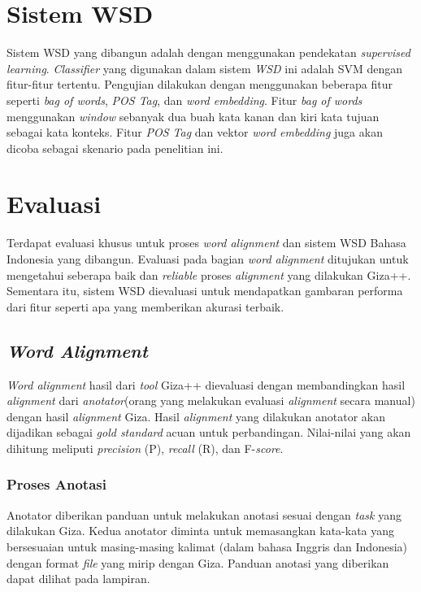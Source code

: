 \section{Sistem WSD} \label{sec:Sistem WSD}
Sistem WSD yang dibangun adalah dengan menggunakan pendekatan \textit{supervised learning}. \textit{Classifier} yang digunakan dalam sistem \textit{WSD} ini adalah SVM dengan fitur-fitur tertentu. Pengujian dilakukan dengan menggunakan beberapa fitur seperti \textit{bag of words}, \textit{POS Tag}, dan \textit{word embedding}. Fitur \textit{bag of words} menggunakan \textit{window} sebanyak dua buah kata kanan dan kiri kata tujuan sebagai kata konteks. Fitur \textit{POS Tag} dan vektor \textit{word embedding} juga akan dicoba sebagai skenario pada penelitian ini.

\section{Evaluasi}

Terdapat evaluasi khusus untuk proses \textit{word alignment} dan sistem WSD Bahasa Indonesia yang dibangun. Evaluasi pada bagian \textit{word alignment} ditujukan untuk mengetahui seberapa baik dan \textit{reliable} proses \textit{alignment} yang dilakukan Giza++. Sementara itu, sistem WSD dievaluasi untuk mendapatkan gambaran performa dari fitur seperti apa yang memberikan akurasi terbaik.

\subsection{\textit{Word Alignment}}
\textit{Word alignment} hasil dari \textit{tool} Giza++ dievaluasi dengan membandingkan hasil \textit{alignment} dari \textit{anotator}(orang yang melakukan evaluasi \textit{alignment} secara manual) dengan hasil \textit{alignment} Giza. Hasil \textit{alignment} yang dilakukan anotator akan dijadikan sebagai \textit{gold standard} acuan untuk perbandingan. Nilai-nilai yang akan dihitung meliputi \textit{precision} (P), \textit{recall} (R), dan F-\textit{score}. 

\subsubsection{Proses Anotasi}

Anotator diberikan panduan untuk melakukan anotasi sesuai dengan \textit{task} yang dilakukan Giza. Kedua anotator diminta untuk memasangkan kata-kata yang bersesuaian untuk masing-masing kalimat (dalam bahasa Inggris dan Indonesia) dengan format \textit{file} yang mirip dengan Giza. Panduan anotasi yang diberikan dapat dilihat pada lampiran.

